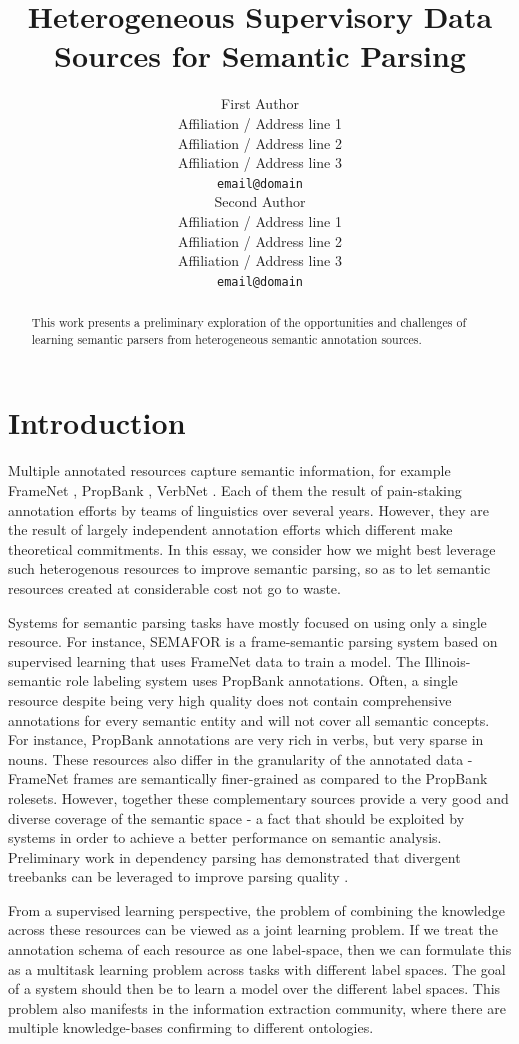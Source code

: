 \documentclass[11pt]{article}
\title{Heterogeneous Supervisory Data Sources for Semantic Parsing}
\author{First Author \\
  Affiliation / Address line 1 \\
  Affiliation / Address line 2 \\
  Affiliation / Address line 3 \\
  {\tt email@domain} \\\And
  Second Author \\
  Affiliation / Address line 1 \\
  Affiliation / Address line 2 \\
  Affiliation / Address line 3 \\
  {\tt email@domain} \\}
\date{}
\begin{document}
\maketitle
\begin{abstract}
This work presents a preliminary exploration of the opportunities and challenges of learning semantic parsers from heterogeneous semantic annotation sources.
\end{abstract}

\section{Introduction}
Multiple annotated resources capture semantic information, for example FrameNet \cite{framenet}, PropBank \cite{propbank}, VerbNet \cite{vnet}. Each of them the result of pain-staking annotation efforts by teams of linguistics over several years. However, they are the result of largely independent annotation efforts which different make theoretical commitments. In this essay, we consider how we might best leverage such heterogenous resources to improve semantic parsing, so as to let semantic resources created at considerable cost not go to waste.

Systems for semantic parsing tasks have mostly focused on using only a single resource. For instance, SEMAFOR \cite{semafor} is a frame-semantic parsing system based on supervised learning that uses FrameNet data to train a model. The Illinois-semantic role labeling system \cite{illinoisSRL} uses PropBank annotations. Often, a single resource despite being very high quality does not contain comprehensive annotations for every semantic entity and will not cover all semantic concepts. For instance, PropBank annotations are very rich in verbs, but very sparse in nouns. These resources also differ in the granularity of the annotated data - FrameNet frames are semantically finer-grained as compared to the PropBank rolesets. However, together these complementary sources provide a very good and diverse coverage of the semantic space - a fact that should be exploited by systems in order to achieve a better performance on semantic analysis. Preliminary work in dependency parsing has demonstrated that divergent treebanks can be leveraged to improve parsing quality \cite{zhou:2013}.

From a supervised learning perspective, the problem of combining the knowledge across these resources can be viewed as a joint learning problem. If we treat the annotation schema of each resource as one label-space, then we can formulate this as a multitask learning problem across tasks with different label spaces. The goal of a system should then be to learn a model over the different label spaces. This problem also manifests in the information extraction community, where there are multiple knowledge-bases confirming to different ontologies.  
\end{document}
